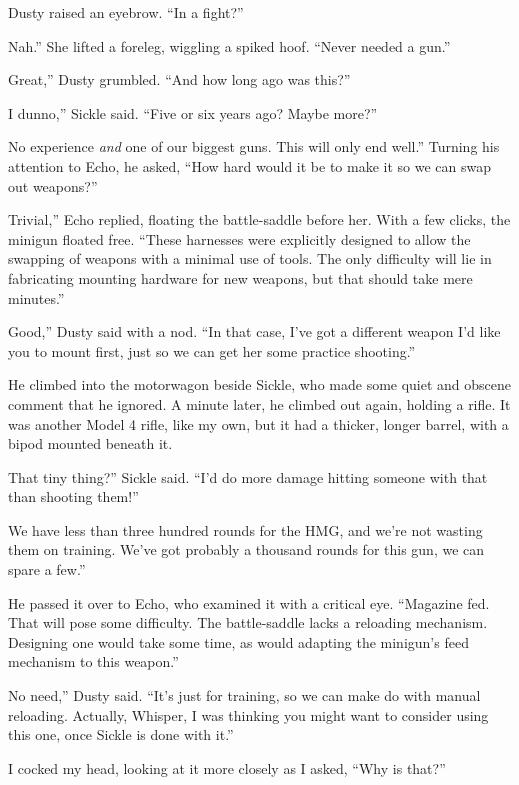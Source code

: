 Dusty raised an eyebrow. “In a fight?”

\leavevmode{}Nah.” She lifted a foreleg, wiggling a spiked hoof. “Never needed a gun.”

\leavevmode{}Great,” Dusty grumbled. “And how long ago was this?”

\leavevmode{}I dunno,” Sickle said. “Five or six years ago? Maybe more?”

\leavevmode{}No experience \textit{and} one of our biggest guns. This will only end well.” Turning his attention to Echo, he asked, “How hard would it be to make it so we can swap out weapons?”

\leavevmode{}Trivial,” Echo replied, floating the battle-saddle before her. With a few clicks, the minigun floated free. “These harnesses were explicitly designed to allow the swapping of weapons with a minimal use of tools. The only difficulty will lie in fabricating mounting hardware for new weapons, but that should take mere minutes.”

\leavevmode{}Good,” Dusty said with a nod. “In that case, I’ve got a different weapon I’d like you to mount first, just so we can get her some practice shooting.”

He climbed into the motorwagon beside Sickle, who made some quiet and obscene comment that he ignored. A minute later, he climbed out again, holding a rifle. It was another Model 4 rifle, like my own, but it had a thicker, longer barrel, with a bipod mounted beneath it.

\leavevmode{}That tiny thing?” Sickle said. “I’d do more damage hitting someone with that than shooting them!”

\leavevmode{}We have less than three hundred rounds for the HMG, and we’re not wasting them on training. We’ve got probably a thousand rounds for this gun, we can spare a few.”

He passed it over to Echo, who examined it with a critical eye. “Magazine fed. That will pose some difficulty. The battle-saddle lacks a reloading mechanism. Designing one would take some time, as would adapting the minigun’s feed mechanism to this weapon.”

\leavevmode{}No need,” Dusty said. “It’s just for training, so we can make do with manual reloading. Actually, Whisper, I was thinking you might want to consider using this one, once Sickle is done with it.”

I cocked my head, looking at it more closely as I asked, “Why is that?”

